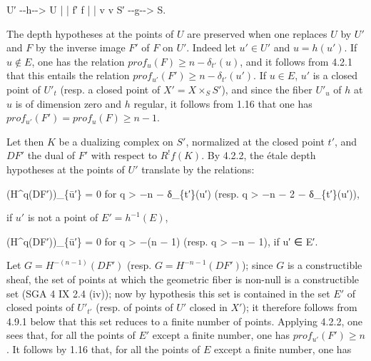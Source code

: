 \documentclass[
  11pt,
  a4paper,
]{book}
\newenvironment{Shaded}{}{}
\newcommand{\NormalTok}[1]{#1}
\begin{document}
\begin{Shaded}
\begin{Highlighting}[]
\NormalTok{U′ {-}{-}h{-}{-}\textgreater{} U}
\NormalTok{|         |}
\NormalTok{f′        f}
\NormalTok{|         |}
\NormalTok{v         v}
\NormalTok{S′ {-}{-}g{-}{-}\textgreater{} S.}
\end{Highlighting}
\end{Shaded}

The depth hypotheses at the points of \(U\) are preserved when one
replaces \(U\) by \(U'\) and \(F\) by the inverse image \(F'\) of \(F\)
on \(U'\). Indeed let \(u' \in U'\) and \(u = h(u')\). If
\(u \notin E\), one has the relation \(prof_{u}(F) \geqslant n -
\delta_{t'}(u)\), and it follows from 4.2.1 that this entails the
relation \(prof_{u'}(F') \geqslant n - \delta_{t'}(u')\). If
\(u \in E\), \(u'\) is a closed point of \(U'_{t}\) (resp. a closed
point of \(X' = X \times_{S} S'\)), and since the fiber \(U'_{u}\) of
\(h\) at \(u\) is of dimension zero and \(h\) regular, it follows from
1.16 that one has \(prof_{u'}(F') =
prof_{u}(F) \geqslant n - 1\).

Let then \(K\) be a dualizing complex on \(S'\), normalized at the
closed point \(t'\), and \(DF'\) the dual of \(F'\) with respect to
\(R^{!} f(K)\). By 4.2.2, the étale depth hypotheses at the points of
\(U'\) translate by the relations:

\begin{Shaded}
\begin{Highlighting}[]
\NormalTok{(H\^{}q(DF′))\_\{ū′\} = 0 for q \textgreater{} −n − δ\_\{t′\}(u′)  (resp. q \textgreater{} −n − 2 − δ\_\{t′\}(u′)),}
\end{Highlighting}
\end{Shaded}

if \(u'\) is not a point of \(E' = h^{-1}(E)\),

\begin{Shaded}
\begin{Highlighting}[]
\NormalTok{(H\^{}q(DF′))\_\{ū′\} = 0 for q \textgreater{} −(n − 1)  (resp. q \textgreater{} −n − 1), if u′ ∈ E′.}
\end{Highlighting}
\end{Shaded}

Let \(G = H^{-(n - 1)}(DF')\) (resp. \(G = H^{-n - 1}(DF')\)); since
\(G\) is a constructible sheaf, the set of points at which the geometric
fiber is non-null is a constructible set (SGA 4 IX 2.4 (iv)); now by
hypothesis this set is contained in the set \(E'\) of closed points of
\(U'_{t'}\) (resp. of points of \(U'\) closed in \(X'\)); it therefore
follows from 4.9.1 below that this set reduces to a finite number of
points. Applying 4.2.2, one sees that, for all the points of \(E'\)
except a finite number, one has \(prof_{u'}(F') \geqslant n\). It
follows by 1.16 that, for all the points of \(E\) except a finite
number, one has
\end{document}
